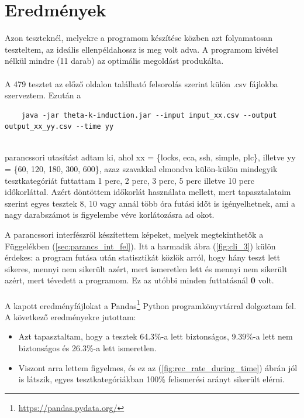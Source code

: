 \section{Eredmények}
\label{sec:kiertekeles_ered}

Azon teszteknél, melyekre a programom készítése közben azt folyamatosan teszteltem, az ideális ellenpéldahossz is meg volt adva. A programom kivétel nélkül mindre (11 darab) az optimális megoldást produkálta. 
\\
\\
A 479 tesztet az előző oldalon található felsorolás szerint külön .csv fájlokba szerveztem. Ezután a 
\ \\
\begin{lstlisting}
	java -jar theta-k-induction.jar --input input_xx.csv --output output_xx_yy.csv --time yy
\end{lstlisting}
\ \\
parancssori utasítást adtam ki, ahol xx = \{locks, eca, ssh, simple, plc\}, illetve yy = \{60, 120, 180, 300, 600\}, azaz szavakkal elmondva külön-külön mindegyik tesztkategóriát futtattam 1 perc, 2 perc, 3 perc, 5 perc illetve 10 perc időkorláttal. Azért döntöttem időkorlát használata mellett, mert tapasztalataim szerint egyes tesztek 8, 10 vagy annál több óra futási időt is igényelhetnek, ami a nagy darabszámot is figyelembe véve korlátozásra ad okot. 

A parancssori interfészről készítettem képeket, melyek megtekinthetők a Függelékben (\ref{sec:parancs_int_fel}). Itt a harmadik ábra (\ref{fig:cli_3}) külön érdekes: a program futása után statisztikát közlök arról, hogy hány teszt lett sikeres, mennyi nem sikerült azért, mert ismeretlen lett és mennyi nem sikerült azért, mert tévedett a programom. Ez az utóbbi minden futtatásnál \textbf{0} volt.
\\
\\
A kapott eredményfájlokat a Pandas\footnote{\url{https://pandas.pydata.org/}} Python programkönyvtárral dolgoztam fel. A következő eredményekre jutottam:

\begin{itemize}
	\item Azt tapasztaltam, hogy a tesztek 64.3\%-a lett biztonságos, 9.39\%-a lett nem biztonságos és 26.3\%-a lett ismeretlen.
	\item Viszont arra lettem figyelmes, és ez az (\ref{fig:rec_rate_during_time}) ábrán jól is látszik, egyes tesztkategóriákban 100\% felismerési arányt sikerült elérni.
\end{itemize}

